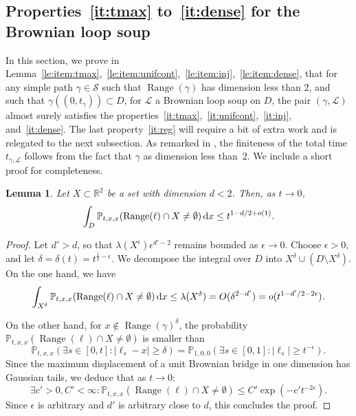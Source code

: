 \documentclass[11pt]{article}
\newtheorem{lemma}[theorem]{Lemma}
\def\d{\,{\rm d}}
\DeclareMathOperator{\Range}{Range}
\begin{document}
\subsection{Properties~\texorpdfstring{\eqref{it:tmax}}{(i)} to~\texorpdfstring{\eqref{it:dense}}{(iv)} for the Brownian loop soup}

In this section, we prove in Lemma~\ref{le:item:tmax},~\ref{le:item:unifcont},~\ref{le:item:inj},~\ref{le:item:dense}, that for any simple path $\gamma\in \mathscr{S}$
such that $\Range(\gamma)$ has dimension less than $2$, and such that $\gamma((0,t_\gamma))\subset D$, for $\mathcal{L}$ a Brownian loop soup on
$D$, the pair $(\gamma,\mathcal{L})$ almost surely satisfies the properties~\eqref{it:tmax},~\eqref{it:unifcont},~\eqref{it:inj}, and~\eqref{it:dense}. The last property~\eqref{it:reg} will require a bit of extra work and is relegated to the next subsection.
As remarked in \cite{LawlerWerner}, the finiteness of the total time $t_{\gamma,\mathcal{L}}$ follows from the fact that $\gamma$ as dimension less than~$2$. We include a short proof for completeness.
\begin{lemma}
    \label{le:tech1}
    Let $X\subset\mathbb{R}^2$ be a set with dimension $d<2$.
    Then,  as $t\to 0$,
    \[
    \int_D \mathbb{P}_{t,x,x}(\Range(\ell)\cap X\neq \emptyset  ) \d x
    \leq t^{1-d/2 +o(1)   }.
    \]
\end{lemma}
\begin{proof}
    Let $d'>d$, so that $\lambda(X^{\epsilon})\epsilon^{d'-2}$ remains bounded as $\epsilon \to 0$.   Choose $\epsilon>0$, and let $\delta=\delta(t)=t^{\frac{1}{2}-\epsilon}$. We decompose the integral over $D$ into $X^\delta \cup ( D\setminus X^\delta )$.
    On the one hand, we have
    \[ \int_{ X^\delta} \mathbb{P}_{t,x,x}(\Range(\ell)\cap X\neq \emptyset ) \d x
    \leq \lambda(X^\delta)=O(\delta^{2-d' } ) = o(t^{ 1-d'/2  -2\epsilon } ). \]

    On the other hand, for $x\notin  \Range(\gamma)^\delta$, the probability $\mathbb{P}_{t,x,x}( \Range(\ell)\cap X\neq \emptyset)$ is smaller than
    \[\mathbb{P}_{t,x,x}(\exists s\in [0,t]: |\ell_s-x|\geq \delta )=
    \mathbb{P}_{1,0,0}(\exists s\in [0,1]: |\ell_s|\geq t^{-\epsilon}  )
    .\]
    Since the maximum displacement of a unit Brownian bridge in one dimension has Gaussian tails, we deduce that as $t\to 0$:
    \[ \exists c'>0, C'<\infty:
    \mathbb{P}_{t,x,x}(\Range(\ell)\cap X\neq \emptyset)\leq C' \exp({-c' t^{ -2 \epsilon} }).
    \]
    Since $\epsilon$ is arbitrary and $d'$ is arbitrary close to $d$, this concludes the proof.
\end{proof}
\end{document}
